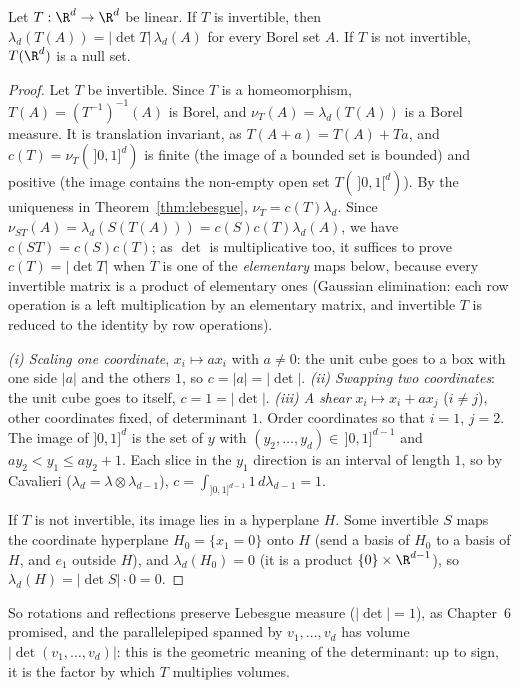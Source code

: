 \begin{theorem}\label{thm:lineardet}
Let $T:\R^d\to\R^d$ be linear. If $T$ is invertible, then $\lambda_d(T(A))=|\det T|\,\lambda_d(A)$ for every Borel set $A$. If $T$ is not invertible, $T(\R^d)$ is a null set.
\end{theorem}
\begin{proof}
Let $T$ be invertible. Since $T$ is a homeomorphism, $T(A)=(T^{-1})^{-1}(A)$ is Borel, and $\nu_T(A)=\lambda_d(T(A))$ is a Borel measure. It is translation invariant, as $T(A+a)=T(A)+Ta$, and
$c(T)=\nu_T(\,]0,1]^d)$ is finite (the image of a bounded set is bounded) and positive (the image contains the non-empty open set $T(\,]0,1[^d)$). By the uniqueness in Theorem~\ref{thm:lebesgue},
$\nu_T=c(T)\lambda_d$. Since $\nu_{ST}(A)=\lambda_d(S(T(A)))=c(S)c(T)\lambda_d(A)$, we have $c(ST)=c(S)c(T)$; as $\det$ is multiplicative too, it suffices to prove $c(T)=|\det T|$ when $T$ is one of the
\emph{elementary} maps below, because every invertible matrix is a product of elementary ones (Gaussian elimination: each row operation is a left multiplication by an elementary matrix,
and invertible $T$ is reduced to the identity by row operations).

\emph{(i) Scaling one coordinate}, $x_i\mapsto ax_i$ with $a\ne0$: the unit cube goes to a box with one side $|a|$ and the others $1$, so $c=|a|=|\det|$.
\emph{(ii) Swapping two coordinates}: the unit cube goes to itself, $c=1=|\det|$.
\emph{(iii) A shear} $x_i\mapsto x_i+ax_j$ ($i\ne j$), other coordinates fixed, of determinant $1$. Order coordinates so that $i=1$, $j=2$. The image of $]0,1]^d$ is the set of $y$ with
$(y_2,\dots,y_d)\in\,]0,1]^{d-1}$ and $ay_2<y_1\le ay_2+1$. Each slice in the $y_1$ direction is an interval of length $1$, so by Cavalieri ($\lambda_d=\lambda\otimes\lambda_{d-1}$), $c=\int_{]0,1]^{d-1}}1\,d\lambda_{d-1}=1$.

If $T$ is not invertible, its image lies in a hyperplane $H$. Some invertible $S$ maps the coordinate hyperplane $H_0=\{x_1=0\}$ onto $H$ (send a basis of $H_0$ to a basis of $H$, and $e_1$ outside $H$), and
$\lambda_d(H_0)=0$ (it is a product $\{0\}\times\R^{d-1}$), so $\lambda_d(H)=|\det S|\cdot0=0$.
\end{proof}

So rotations and reflections preserve Lebesgue measure ($|\det|=1$), as Chapter~6 promised, and the parallelepiped spanned by $v_1,\dots,v_d$ has volume $|\det(v_1,\dots,v_d)|$: this is the
geometric meaning of the determinant: up to sign, it is the factor by which $T$ multiplies volumes.

